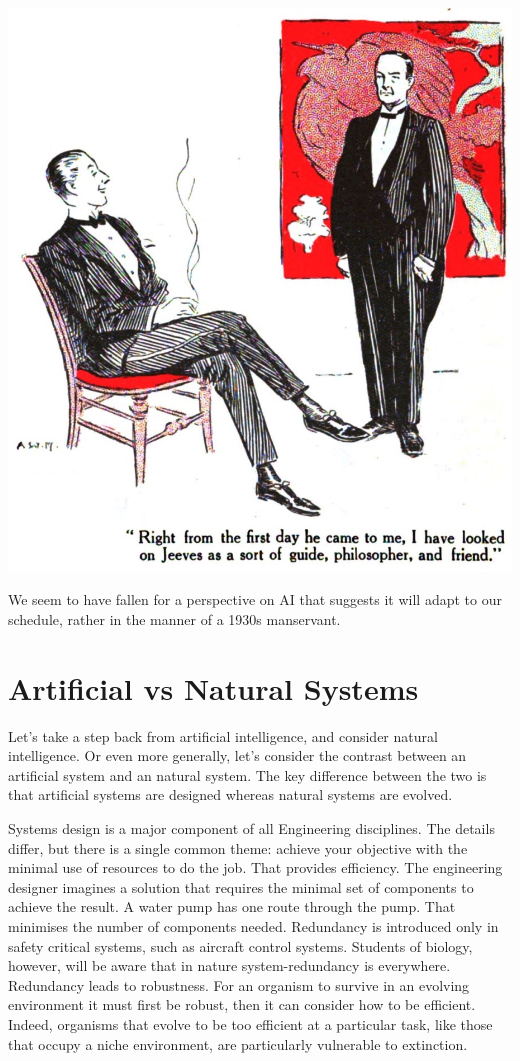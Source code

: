 \documentclass[a4paper]{caesar_book}
\begin{document}
\begin{marginfigure}%
    \includegraphics[width=\marginparwidth]{pictures/Jeeves_in_the_Springtime_01.jpg}%
    \caption*{We seem to have fallen for a perspective on AI that suggests it will adapt to our schedule, rather in the manner of a 1930s manservant.\label{rectangle}}%
\end{marginfigure}%

\section{Artificial vs Natural Systems}

Let’s take a step back from artificial intelligence, and consider natural intelligence. Or even more generally, let’s consider the contrast between an artificial system and an natural system. The key difference between the two is that artificial systems are designed whereas natural systems are evolved.

Systems design is a major component of all Engineering disciplines. The details differ, but there is a single common theme: achieve your objective with the minimal use of resources to do the job. That provides efficiency. The engineering designer imagines a solution that requires the minimal set of components to achieve the result. A water pump has one route through the pump. That minimises the number of components needed. Redundancy is introduced only in safety critical systems, such as aircraft control systems. Students of biology, however, will be aware that in nature system-redundancy is everywhere. Redundancy leads to robustness. For an organism to survive in an evolving environment it must first be robust, then it can consider how to be efficient. Indeed, organisms that evolve to be too efficient at a particular task, like those that occupy a niche environment, are particularly vulnerable to extinction.
\end{document}
